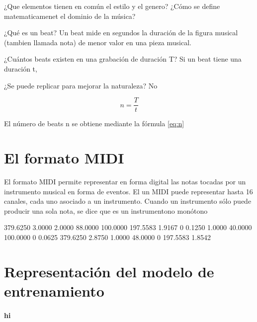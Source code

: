 ¿Que elementos tienen en común el estilo y el genero?
¿Cómo se define matematicamenet el dominio de la música?

¿Qué es un beat?
	Un beat mide en segundos la duración de la figura musical (tambien llamada nota) de menor valor en una pieza musical.

¿Cuántos beats existen en una grabación de duración T?
	Si un beat tiene una duración t, 


¿Se puede replicar para mejorar la naturaleza?
No

\begin{equation} \label{eq:n}
	n = \frac{T}{t}
\end{equation}

El número de beats n se obtiene mediante la fórmula \eqref{eq:n}


\section{El formato MIDI}
	El formato MIDI permite representar en forma digital las notas tocadas por un instrumento musical en forma de eventos. El un MIDI puede representar hasta 16 canales, cada uno asociado a un instrumento. Cuando un instrumento sólo puede producir una sola nota, se dice que es un instrumentono monótono


	



  379.6250    3.0000    2.0000   88.0000  100.0000  197.5583    1.9167
         0    0.1250    1.0000   40.0000  100.0000         0    0.0625
  379.6250    2.8750    1.0000   48.0000         0  197.5583    1.8542
  
\section{Representación del modelo de entrenamiento}
    \paragraph{
        hi
    }
